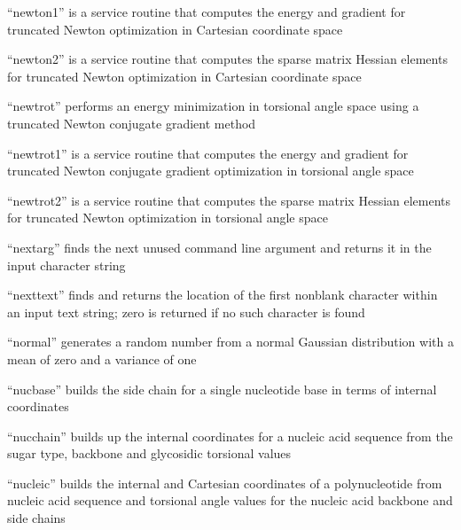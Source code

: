 \documentclass[letterpaper,11pt,english]{sphinxmanual}
\begin{document}

“newton1” is a service routine that computes the energy and gradient for truncated Newton optimization in Cartesian coordinate space


“newton2” is a service routine that computes the sparse matrix Hessian elements for truncated Newton optimization in Cartesian coordinate space


“newtrot” performs an energy minimization in torsional angle space using a truncated Newton conjugate gradient method


“newtrot1” is a service routine that computes the energy and gradient for truncated Newton conjugate gradient optimization in torsional angle space


“newtrot2” is a service routine that computes the sparse matrix Hessian elements for truncated Newton optimization in torsional angle space


“nextarg” finds the next unused command line argument and returns it in the input character string


“nexttext” finds and returns the location of the first non\sphinxhyphen{}blank character within an input text string; zero is returned if no such character is found


“normal” generates a random number from a normal Gaussian distribution with a mean of zero and a variance of one


“nucbase” builds the side chain for a single nucleotide base in terms of internal coordinates


“nucchain” builds up the internal coordinates for a nucleic acid sequence from the sugar type, backbone and glycosidic torsional values


“nucleic” builds the internal and Cartesian coordinates of a polynucleotide from nucleic acid sequence and torsional angle values for the nucleic acid backbone and side chains
\end{document}
